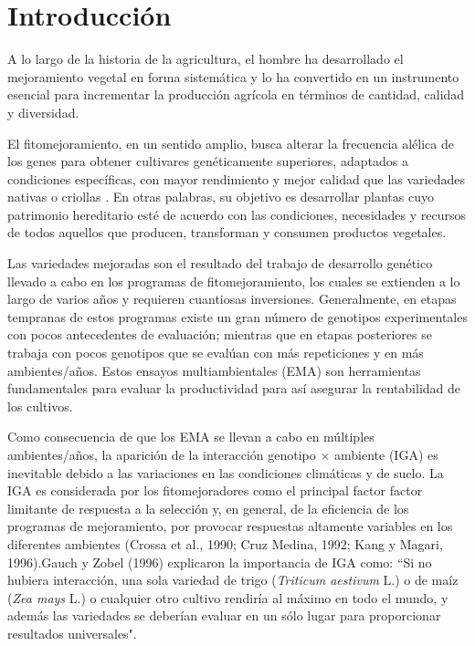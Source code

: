 

\chapter{Introducción}


A lo largo de la historia de la agricultura, el hombre ha desarrollado el mejoramiento vegetal en forma sistemática y lo ha convertido en un instrumento esencial para incrementar la producción agrícola en términos de cantidad, calidad y diversidad.  

El fitomejoramiento, en un sentido amplio, busca alterar la frecuencia alélica de los genes para obtener cultivares  genéticamente superiores, adaptados a condiciones específicas, con mayor rendimiento y mejor calidad que las variedades nativas o criollas \citep{Allard67}. En otras palabras, su objetivo es desarrollar plantas cuyo patrimonio hereditario esté de acuerdo con las condiciones, necesidades y recursos de  todos aquellos que producen, transforman y consumen productos vegetales. 

Las variedades mejoradas son el resultado del trabajo de desarrollo genético llevado a cabo en los programas de fitomejoramiento, los cuales se extienden a lo largo de varios años y requieren cuantiosas inversiones. Generalmente, en etapas tempranas de estos programas existe un gran número de genotipos experimentales con pocos antecedentes de evaluación; mientras que en etapas posteriores  se trabaja con pocos genotipos que se evalúan con más repeticiones y en más ambientes/años. Estos ensayos multiambientales (EMA) son herramientas fundamentales para evaluar la productividad para así asegurar la rentabilidad de los cultivos.

Como consecuencia de que los EMA se llevan a cabo en múltiples ambientes/años, la aparición de la interacción genotipo $\times$ ambiente (IGA) es inevitable debido a las variaciones en las condiciones climáticas y de suelo. La IGA es considerada por los fitomejoradores como el principal factor factor limitante de  respuesta a la selección y, en general, de la eficiencia de los programas de mejoramiento, por provocar respuestas altamente variables en los diferentes ambientes (Crossa et al., 1990; Cruz Medina, 1992; Kang y Magari, 1996).Gauch y Zobel (1996) explicaron la importancia de IGA como: “Si no hubiera interacción, una sola variedad de trigo (\emph{Triticum aestivum} L.) o de maíz (\emph{Zea mays} L.) o cualquier otro cultivo rendiría al máximo en todo el mundo, y además las variedades se deberían evaluar en un sólo lugar para proporcionar resultados universales".



